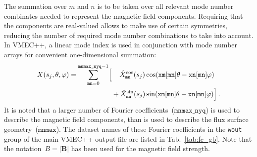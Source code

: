 The summation over $m$ and $n$ is to be taken over all relevant mode number combinates
needed to represent the magnetic field components.
Requiring that the components are real-valued
allows to make use of certain symmetries, reducing the number of required mode number
combinations to take into account.
%
In VMEC++, a linear mode index is used in conjunction with mode number arrays
for convenient one-dimensional summation:
\begin{align}
 X(s_j, \theta, \varphi) =
 \sum\limits_{\texttt{mn}=0}^{\texttt{mnmax\_nyq} - 1}
   \Bigl[ &\phantom{+}~ \hat{X}_\texttt{mn}^\textrm{cos}(s_j) \cos(\texttt{xm}[\texttt{mn}] \theta - \texttt{xn}[\texttt{mn}] \varphi) \nonumber \\
         ~&         +   \hat{X}_\texttt{mn}^\textrm{sin}(s_j) \sin(\texttt{xm}[\texttt{mn}] \theta - \texttt{xn}[\texttt{mn}] \varphi) \Bigr] \, .
\end{align}
%
It is noted that a larger number of Fourier coefficients~($\texttt{mnmax\_nyq}$)
is used to describe the magnetic field components,
than is used to describe the flux surface geometry~($\texttt{mnmax}$).
%
The dataset names of these Fourier coefficients in the \texttt{wout} group
of the main VMEC++ output file are listed in Tab.~\ref{tab:fc_gb}.
Note that the notation~$B = \vert\mathbf{B}\vert$
has been used for the magnetic field strength.
